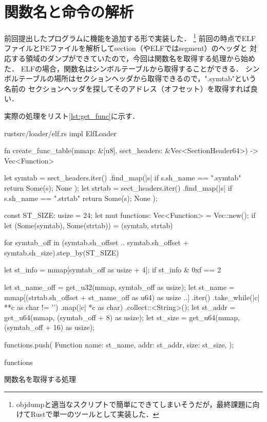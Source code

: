 \documentclass[12pt,a4paper,dvipdfmx]{jsarticle}
\begin{document}



\section{関数名と命令の解析}
前回提出したプログラムに機能を追加する形で実装した．
\footnote{objdumpと適当なスクリプトで簡単にできてしまいそうだが，最終課題に向けてRustで単一のツールとして実装した．}
前回の時点でELFファイルとPEファイルを解析してsection（やELFではsegment）のヘッダと
対応する領域のダンプができていたので，今回は関数名を取得する処理から始めた．
ELFの場合，関数名はシンボルテーブルから取得することができる．
シンボルテーブルの場所はセクションヘッダから取得できるので，".symtab"という名前の
セクションヘッダを探してそのアドレス（オフセット）を取得すれば良い．

実際の処理をリスト\ref{lst:get_func}に示す．
\begin{longlisting}
\begin{myminted}{rust}{src/loader/elf.rs}
impl ElfLoader {
    fn create_func_table(mmap: &[u8], sect_headers: &Vec<SectionHeader64>) -> Vec<Function> {
        let symtab = sect_headers.iter()
            .find_map(|s| {
                if s.sh_name == ".symtab" {
                    return Some(s);
                }
                None
            });
        let strtab = sect_headers.iter()
            .find_map(|s| {
                if s.sh_name == ".strtab" {
                    return Some(s);
                }
                None
            });

        const ST_SIZE: usize = 24;
        let mut functions: Vec<Function> = Vec::new();
        if let (Some(symtab), Some(strtab)) = (symtab, strtab) {
            for symtab_off in (symtab.sh_offset .. symtab.sh_offset + symtab.sh_size).step_by(ST_SIZE) {
                let st_info = mmap[symtab_off as usize + 4];
                if st_info & 0xf == 2 {
                    let st_name_off = get_u32(mmap, symtab_off as usize);
                    let st_name = mmap[(strtab.sh_offset + st_name_off as u64) as usize ..]
                        .iter()
                        .take_while(|c| **c as char != '\0')
                        .map(|c| *c as char)
                        .collect::<String>();
                    let st_addr = get_u64(mmap, (symtab_off + 8) as usize);
                    let st_size = get_u64(mmap, (symtab_off + 16) as usize);

                    functions.push(
                        Function {
                            name: st_name,
                            addr: st_addr,
                            size: st_size,
                        }
                    );
                }
            }
        }

        functions
    }
}
\end{myminted}
\caption{関数名を取得する処理}
\label{lst:get_func}
\end{longlisting}
\end{document}
